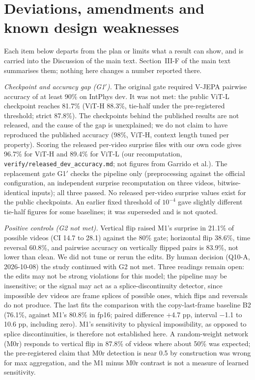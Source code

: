 \section{Deviations, amendments and known design weaknesses}
\label{sec:supp-dev}
Each item below departs from the plan or limits what a result can show, and is carried into the Discussion of the main text. Section~III-F of the main text summarises them; nothing here changes a number reported there.

\emph{Checkpoint and accuracy gap (G1$'$).} The original gate required V-JEPA pairwise accuracy of at least 90\% on IntPhys dev. It was not met: the public ViT-L checkpoint reaches 81.7\% (ViT-H 88.3\%, tie-half under the pre-registered threshold; strict 87.8\%). The checkpoints behind the published results are not released, and the cause of the gap is unexplained; we do not claim to have reproduced the published accuracy (98\%, ViT-H, context length tuned per property). Scoring the released per-video surprise files with our own code gives 96.7\% for ViT-H and 89.4\% for ViT-L (our recomputation, \texttt{verify/released\_dev\_accuracy.md}; not figures from Garrido et al.). The replacement gate G1$'$ checks the pipeline only (preprocessing against the official configuration, an independent surprise recomputation on three videos, bitwise-identical inputs); all three passed. No released per-video surprise values exist for the public checkpoints. An earlier fixed threshold of $10^{-4}$ gave slightly different tie-half figures for some baselines; it was superseded and is not quoted.

\emph{Positive controls (G2 not met).} Vertical flip raised M1's surprise in 21.1\% of possible videos (CI 14.7 to 28.1) against the 80\% gate; horizontal flip 38.6\%, time reversal 60.8\%, and pairwise accuracy on vertically flipped pairs is 83.9\%, not lower than clean. We did not tune or rerun the edits. By human decision (Q10-A, 2026-10-08) the study continued with G2 not met. Three readings remain open: the edits may not be strong violations for this model; the pipeline may be insensitive; or the signal may act as a splice-discontinuity detector, since impossible dev videos are frame splices of possible ones, which flips and reversals do not produce. The last fits the comparison with the copy-last-frame baseline B2 (76.1\%, against M1's 80.8\% in fp16; paired difference +4.7 pp, interval $-$1.1 to 10.6 pp, including zero). M1's sensitivity to physical impossibility, as opposed to splice discontinuities, is therefore not established here. A random-weight network (M0r) responds to vertical flip in 87.8\% of videos where about 50\% was expected; the pre-registered claim that M0r detection is near 0.5 by construction was wrong for max aggregation, and the M1 minus M0r contrast is not a measure of learned sensitivity.

